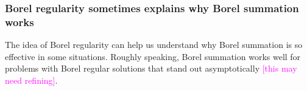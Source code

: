\documentclass{article}
\let\Re\relax
\DeclareMathOperator{\Re}{Re}
\theoremstyle{definition}
\newcommand{\C}{\mathbb{C}}
\newcommand{\series}[1]{\tilde{#1}}
\newcommand*{\defeq}{\mathrel{\vcenter{\baselineskip0.5ex \lineskiplimit0pt
                     \hbox{\scriptsize.}\hbox{\scriptsize.}}}%
                     =}
\newcommand{\borel}{\mathcal{B}}
\begin{document}
\subsubsection{Borel regularity sometimes explains why Borel summation works}\label{borel-reg:explanatory-power}
The idea of Borel regularity can help us understand why Borel summation is so effective in some situations. Roughly speaking, Borel summation works well for problems with Borel regular solutions that stand out asymptotically \textcolor{magenta}{[this may need refining]}.
\end{document}
